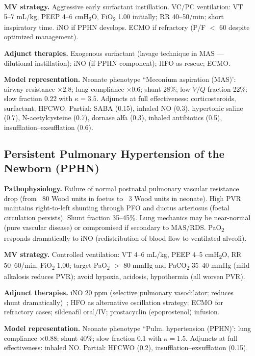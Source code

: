 \textbf{MV strategy.} Aggressive early surfactant instillation. VC/PC ventilation: VT 5--7 mL/kg, PEEP 4--6 cmH\textsubscript{2}O, FiO\textsubscript{2} 1.00 initially; RR 40--50/min; short inspiratory time. iNO if PPHN develops. ECMO if refractory (P/F $<$ 60 despite optimized management).

\textbf{Adjunct therapies.} Exogenous surfactant (lavage technique in MAS --- dilutional instillation); iNO (if PPHN component); HFO as rescue; ECMO.

\textbf{Model representation.} Neonate phenotype ``Meconium aspiration (MAS)': airway resistance $\times2.8$; lung compliance $\times0.6$; shunt 28\%; low-$\dot V/\dot Q$ fraction 22\%; slow fraction 0.22 with $\kappa=3.5$. Adjuncts at full effectiveness: corticosteroids, surfactant, HFCWO. Partial: SABA (0.15), inhaled NO (0.3), hypertonic saline (0.7), N-acetylcysteine (0.7), dornase alfa (0.3), inhaled antibiotics (0.5), insufflation--exsufflation (0.6).

\subsection{Persistent Pulmonary Hypertension of the Newborn (PPHN)}
\textbf{Pathophysiology.} Failure of normal postnatal pulmonary vascular resistance drop (from ~80 Wood units in foetus to ~3 Wood units in neonate). High PVR maintains right-to-left shunting through PFO and ductus arteriosus (foetal circulation persists). Shunt fraction 35--45\%. Lung mechanics may be near-normal (pure vascular disease) or compromised if secondary to MAS/RDS. PaO\textsubscript{2} responds dramatically to iNO (redistribution of blood flow to ventilated alveoli).

\textbf{MV strategy.} Controlled ventilation: VT 4--6 mL/kg, PEEP 4--5 cmH\textsubscript{2}O, RR 50--60/min, FiO\textsubscript{2} 1.00; target PaO\textsubscript{2} $>$ 80 mmHg and PaCO\textsubscript{2} 35--40 mmHg (mild alkalosis reduces PVR); avoid hypoxia, acidosis, hypothermia (all worsen PVR).

\textbf{Adjunct therapies.} iNO 20 ppm (selective pulmonary vasodilator; reduces shunt dramatically)~\citep{clark2000}; HFO as alternative oscillation strategy; ECMO for refractory cases; sildenafil oral/IV; prostacyclin (epoprostenol) infusion.

\textbf{Model representation.} Neonate phenotype ``Pulm. hypertension (PPHN)': lung compliance $\times0.88$; shunt 40\%; slow fraction 0.1 with $\kappa=1.5$. Adjuncts at full effectiveness: inhaled NO. Partial: HFCWO (0.2), insufflation--exsufflation (0.15).

